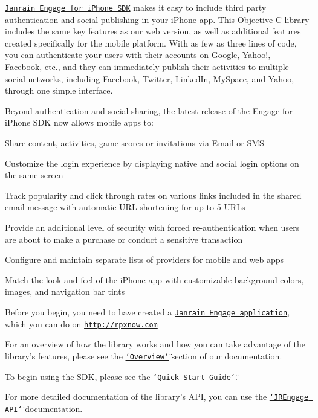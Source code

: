 \href{http://rpxnow.com/docs/iphone}{\tt Janrain Engage for iPhone SDK} makes it easy to include third party authentication and social publishing in your iPhone app. This Objective-\/C library includes the same key features as our web version, as well as additional features created specifically for the mobile platform. With as few as three lines of code, you can authenticate your users with their accounts on Google, Yahoo!, Facebook, etc., and they can immediately publish their activities to multiple social networks, including Facebook, Twitter, LinkedIn, MySpace, and Yahoo, through one simple interface.

Beyond authentication and social sharing, the latest release of the Engage for iPhone SDK now allows mobile apps to:
\begin{DoxyItemize}
\item Share content, activities, game scores or invitations via Email or SMS
\item Customize the login experience by displaying native and social login options on the same screen
\item Track popularity and click through rates on various links included in the shared email message with automatic URL shortening for up to 5 URLs
\item Provide an additional level of security with forced re-\/authentication when users are about to make a purchase or conduct a sensitive transaction
\item Configure and maintain separate lists of providers for mobile and web apps
\item Match the look and feel of the iPhone app with customizable background colors, images, and navigation bar tints
\end{DoxyItemize}

Before you begin, you need to have created a \href{https://rpxnow.com/signup_createapp_plus}{\tt Janrain Engage application}, which you can do on \href{http://rpxnow.com}{\tt http://rpxnow.com}

For an overview of how the library works and how you can take advantage of the library's features, please see the \href{http://rpxnow.com/docs/iphone#user_experience}{\tt \char`\"{}Overview\char`\"{}} section of our documentation.

To begin using the SDK, please see the \href{http://rpxnow.com/docs/iphone#quick}{\tt \char`\"{}Quick Start Guide\char`\"{}}.

For more detailed documentation of the library's API, you can use the \href{http://rpxnow.com/docs/iphone_api/annotated.html}{\tt \char`\"{}JREngage API\char`\"{}} documentation. 